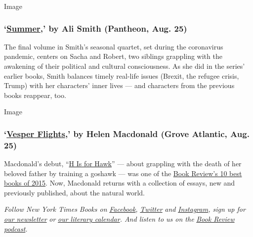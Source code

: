 Image

\hypertarget{summer-by-ali-smith-pantheon-aug-25}{%
\subsubsection{\texorpdfstring{`\href{https://www.penguinrandomhouse.com/books/259057/summer-by-ali-smith/}{Summer},'
by Ali Smith (Pantheon, Aug.
25)}{`Summer,' by Ali Smith (Pantheon, Aug. 25)}}\label{summer-by-ali-smith-pantheon-aug-25}}

The final volume in Smith's seasonal quartet, set during the coronavirus
pandemic, centers on Sacha and Robert, two siblings grappling with the
awakening of their political and cultural consciousness. As she did in
the series' earlier books, Smith balances timely real-life issues
(Brexit, the refugee crisis, Trump) with her characters' inner lives ---
and characters from the previous books reappear, too.

Image

\hypertarget{vesper-flights-by-helen-macdonald-grove-atlantic-aug-25}{%
\subsubsection{\texorpdfstring{`\href{https://groveatlantic.com/book/vesper-flights/}{Vesper
Flights},' by Helen Macdonald (Grove Atlantic, Aug.
25)}{`Vesper Flights,' by Helen Macdonald (Grove Atlantic, Aug. 25)}}\label{vesper-flights-by-helen-macdonald-grove-atlantic-aug-25}}

Macdonald's debut,
``\href{https://www.nytimes3xbfgragh.onion/2015/02/22/books/review/helen-macdonalds-h-is-for-hawk.html}{H
Is for Hawk}'' --- about grappling with the death of her beloved father
by training a goshawk --- was one of the
\href{https://www.nytimes3xbfgragh.onion/interactive/2015/12/02/books/review/best-books-of-2015.html}{Book
Review's 10 best books of 2015}. Now, Macdonald returns with a
collection of essays, new and previously published, about the natural
world.

\emph{Follow New York Times Books on}
\href{https://www.facebookcorewwwi.onion/nytbooks/}{\emph{Facebook}}\emph{,}
\href{https://twitter.com/nytimesbooks}{\emph{Twitter}} \emph{and}
\href{https://www.instagram.com/nytbooks/}{\emph{Instagram}}\emph{, sign
up for}
\href{https://www.nytimes3xbfgragh.onion/newsletters/books-review}{\emph{our
newsletter}} \emph{or}
\href{https://www.nytimes3xbfgragh.onion/interactive/2017/books/books-calendar.html}{\emph{our
literary calendar}}\emph{. And listen to us on the}
\href{https://www.nytimes3xbfgragh.onion/column/book-review-podcast}{\emph{Book
Review podcast}}\emph{.}

